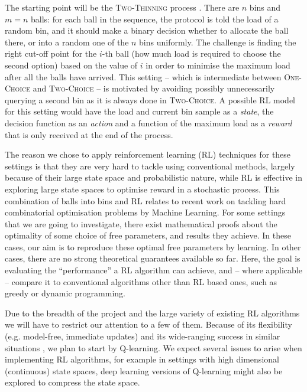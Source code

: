 \documentclass[11pt,a4paper]{article}
\begin{document}
The starting point will be the \textsc{Two-Thinning} process \cite{feldheim2021power}. There are $n$ bins and $m=n$ balls: for each ball in the sequence, the protocol is told the load of a random bin, and it should make a binary decision whether to allocate the ball there, or into a random one of the $n$ bins uniformly. The challenge is finding the right cut-off point for the $i$-th ball (how much load is required to choose the second option) based on the value of $i$ in order to minimise the maximum load after all the balls have arrived. This setting -- which is intermediate between \textsc{One-Choice} and \textsc{Two-Choice} \cite{feldheim2021power} -- is motivated by avoiding possibly unnecessarily querying a second bin as it is always done in \textsc{Two-Choice}. A possible RL model for this setting would have the load and current bin sample as a \textit{state}, the decision function as an \textit{action} and a function of the maximum load as a \textit{reward} that is only received at the end of the process.


The reason we chose to apply reinforcement learning (RL) techniques for these settings is that they are very hard to tackle using conventional methods, largely because of their large state space and probabilistic nature, while RL is effective in exploring large state spaces to optimise reward in a stochastic process. This combination of balls into bins and RL relates to recent work \cite{mitzenmacher2020algorithms} on tackling hard combinatorial optimisation problems by Machine Learning. For some settings that we are going to investigate, there exist mathematical proofs about the optimality of some choice of free parameters, and results they achieve. In these cases, our aim is to reproduce these optimal free parameters by learning. In other cases, there are no strong theoretical guarantees available so far. Here, the goal is evaluating the ``performance'' a RL algorithm can achieve, and -- where applicable -- compare it to conventional algorithms other than RL based ones, such as greedy or dynamic programming.

Due to the breadth of the project and the large variety of existing RL algorithms we will have to restrict our attention to a few of them. Because of its flexibility (e.g. model-free, immediate updates) and its wide-ranging success in similar situations \cite{jang2019q}, we plan to start by Q-learning. We expect several issues to arise when implementing RL algorithms, for example in settings with high dimensional (continuous) state spaces, deep learning versions of Q-learning might also be explored to compress the state space.
\end{document}
